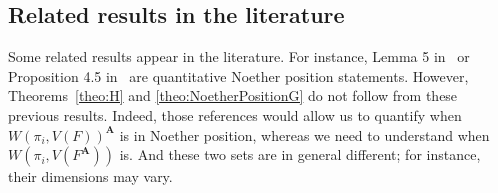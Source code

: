 \documentclass[a4paper]{article}
\def\mA{{\bm A}}
\begin{document}
\subsection{Related results in the literature}
Some related results appear in the literature. For instance, Lemma 5
in~\cite{JeSa10} or Proposition 4.5
in~\cite{SharpEstimatesForTheEffectiveN} are quantitative Noether
position statements. However, Theorems~\ref{theo:H} and \ref{theo:NoetherPositionG} do not follow
from these previous results. Indeed, those references would allow us
to quantify when $W(\pi_i,V(F))^\mA$ is in Noether position, whereas
we need to understand when $W(\pi_i,V(F^\mA))$ is. And these two sets are in general different; for instance, their dimensions may vary. 



%
%




















\end{document}
